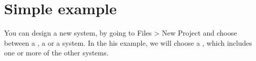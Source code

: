 \documentclass[letterpaper,10pt,english]{sphinxmanual}
\begin{document}
\section{Simple example}
\label{\detokenize{gui/gui:simple-example}}
\sphinxAtStartPar
You can design a new system, by going to Files \sphinxhyphen{}\textgreater{} New Project
and choose between a {\hyperref[\detokenize{celestial_systems/planetary_system:id1}]{}}, a
{\hyperref[\detokenize{celestial_systems/stellar_system:id1}]{}} or a {\hyperref[\detokenize{celestial_systems/multi_stellar_system:id1}]{}} system.
In the his example, we will choose a {\hyperref[\detokenize{celestial_systems/multi_stellar_system:id1}]{}},
which includes one or more of the other systems.
\end{document}
